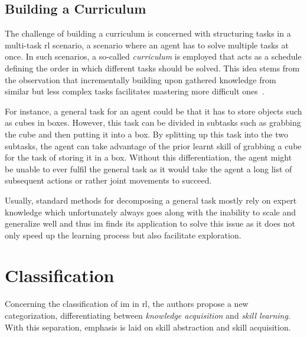 \documentclass[draft,final]{vutinfth} %
\begin{document}
    \subsection{Building a Curriculum}\label{subsec:building-a-curriculum}
    The challenge of building a curriculum is concerned with structuring tasks in a multi-task \gls{rl} scenario, a scenario where an agent has to solve multiple tasks at once.
    In such scenarios, a so-called \textit{curriculum} is employed that acts as a schedule defining the order in which different tasks should be solved.
    This idea stems from the observation that incrementally building upon gathered knowledge from similar but less complex tasks facilitates mastering more difficult ones~\citep{aubret_survey_2019}.

    For instance, a general task for an agent could be that it has to store objects such as cubes in boxes.
    However, this task can be divided in subtasks such as grabbing the cube and then putting it into a box.
    By splitting up this task into the two subtasks, the agent can take advantage of the prior learnt skill of grabbing a cube for the task of storing it in a box.
    Without this differentiation, the agent might be unable to ever fulfil the general task as it would take the agent a long list of subsequent actions or rather joint movements to succeed.

    Usually, standard methods for decomposing a general task mostly rely on expert knowledge which unfortunately always goes along with the inability to scale and generalize well and thus \gls{im} finds its application to solve this issue as it does not only speed up the learning process but also facilitate exploration.


    \section{Classification}

    Concerning the classification of \gls{im} in \gls{rl}, the authors \citeauthor{aubret_survey_2019} propose a new categorization, differentiating between \textit{knowledge acquisition} and \textit{skill learning}.
    With this separation, emphasis is laid on skill abstraction and skill acquisition.
\end{document}
